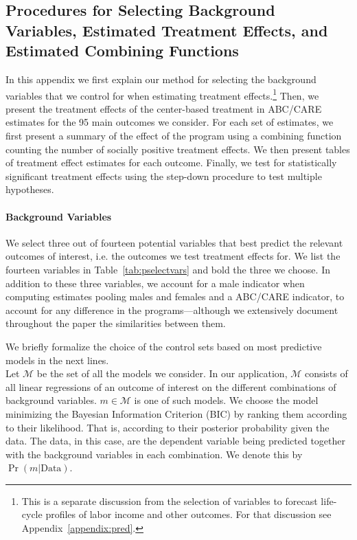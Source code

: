 \subsection{Procedures for Selecting Background Variables, Estimated Treatment Effects, and Estimated Combining Functions} \label{appendix:results}

\noindent In this appendix we first explain our method for selecting the background variables that we control for when estimating treatment effects.\footnote{This is a separate discussion from the selection of variables to forecast life-cycle profiles of labor income and other outcomes. For that discussion see Appendix~\ref{appendix:pred}.} Then, we present the treatment effects of the center-based treatment in ABC/CARE estimates for the 95 main outcomes we consider. For each set of estimates, we first present a summary of the effect of the program using a combining function counting the number of socially positive treatment effects. We then present tables of treatment effect estimates for each outcome. Finally, we test for statistically significant treatment effects using the step-down procedure to test multiple hypotheses.\\

\paragraph{Background Variables} \label{appendix:bvariables}

\noindent We select three out of fourteen potential variables that best predict the relevant outcomes of interest, i.e. the outcomes we test treatment effects for. We list the fourteen variables in Table~\ref{tab:pselectvars} and bold the three we choose. In addition to these three variables, we account for a male indicator when computing estimates pooling males and females and a ABC/CARE indicator, to account for any difference in the programs---although we extensively document throughout the paper the similarities between them.

\singlespacing

\doublespacing

\noindent We briefly formalize the choice of the control sets based on most predictive models in the next lines.\\

\noindent Let $\mathcal{M}$ be the set of all the models we consider. In our application, $\mathcal{M}$ consists of all linear regressions of an outcome of interest on the different combinations of background variables. $m \in \mathcal{M}$ is one of such models. We choose the model minimizing the Bayesian Information Criterion (BIC) by ranking them according to their likelihood. That is, according to their posterior probability given the data. The data, in this case, are the dependent variable being predicted together with the background variables in each combination. We denote this by $\Pr( m | \text{Data} )$.\\


